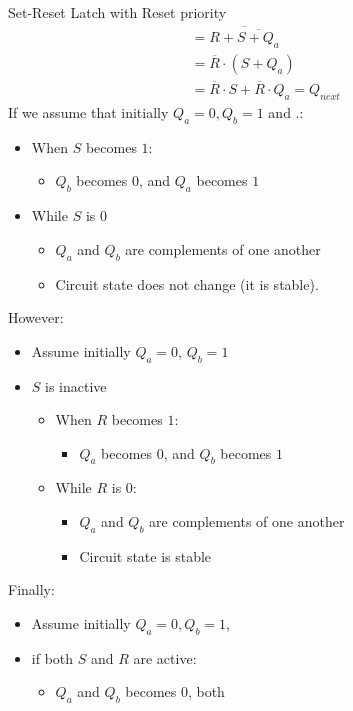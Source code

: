 \begin{parag}{Set-Reset Latch with Reset priority}
\begin{align*}
           &= \overline{R + \overline{S + Q_a}}\\
           &= \overline{R} \cdot (S + Q_a)\\
           &= \overline{R} \cdot S + \overline{R} \cdot Q_a = Q_{next}
       \end{align*}
       If we assume that  initially $Q_a = 0, Q_b = 1$ and .:
       \begin{itemize}
           \item When $S$ becomes $1$:
               \begin{itemize}
                   \item $Q_b$ becomes $0$, and $Q_a$ becomes $1$
               \end{itemize}
           \item While $S$ is $0$
               \begin{itemize}
                   \item $Q_a$ and $Q_b$ are complements of one another
                   \item Circuit state does not change (it is stable).
               \end{itemize}
       \end{itemize}
       
       However:
       \begin{itemize}
           \item Assume initially $Q_a = 0$, $Q_b = 1$
           \item $S$ is inactive
               \begin{itemize}
                   \item When $R$ becomes $1$:
                       \begin{itemize}
                           \item $Q_a$ becomes $0$, and $Q_b$ becomes $1$
                       \end{itemize}
                   \item While $R$ is $0$:
                       \begin{itemize}
                           \item $Q_a$ and $Q_b$ are complements of one another
                           \item Circuit state is stable
                       \end{itemize}
               \end{itemize}
       \end{itemize}
       Finally:
       \begin{itemize}
           \item Assume initially $Q_a = 0, Q_b = 1$,
           \item if both $S$ and $R$ are active:
               \begin{itemize}
                   \item $Q_a$ and $Q_b$ becomes $0$, both
               \end{itemize}
       \end{itemize}
       

\end{parag}
